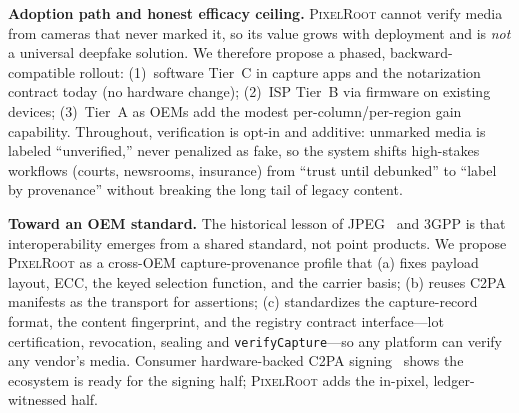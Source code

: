 \documentclass[journal]{IEEEtran}
\newcommand{\pr}{\textup{\textsc{PixelRoot}}}
\begin{document}
\else
\textbf{Adoption path and honest efficacy ceiling.} \pr{} cannot verify media
from cameras that never marked it, so its value grows with deployment and is
\emph{not} a universal deepfake solution. We therefore propose a phased,
backward-compatible rollout: (1)~software Tier~C in capture apps and the
notarization contract today (no hardware change); (2)~ISP Tier~B via firmware on
existing devices; (3)~Tier~A as OEMs add the modest per-column/per-region gain
capability. Throughout, verification is opt-in and additive: unmarked media is
labeled ``unverified,'' never penalized as fake, so the system shifts
high-stakes workflows (courts, newsrooms, insurance) from ``trust until
debunked'' to ``label by provenance'' without breaking the long tail of legacy
content.

\textbf{Toward an OEM standard.} The historical lesson of JPEG~\cite{wallace1992jpeg}
and 3GPP is that interoperability emerges from a shared standard, not point
products. We propose \pr{} as a cross-OEM capture-provenance profile that (a)
fixes payload layout, ECC, the keyed selection function, and the carrier basis;
(b) reuses C2PA manifests as the transport for assertions; (c) standardizes
the capture-record format, the content fingerprint, and the registry contract
interface---lot certification, revocation, sealing and \texttt{verifyCapture}---so
any platform can verify any vendor's media. Consumer hardware-backed C2PA signing~\cite{google2025c2pa,truepic2024capture}
shows the ecosystem is ready for the signing half; \pr{} adds the in-pixel,
ledger-witnessed half.

\fi
\end{document}
